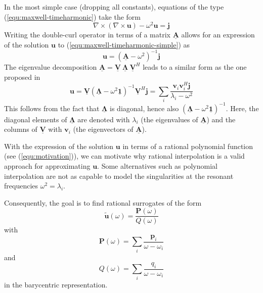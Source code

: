 \documentclass[11pt, a4paper]{article}
\begin{document}
In the most simple case (dropping all constants), equations of the type
(\ref{equ:maxwell-timeharmonic}) take the form
\begin{equation}
    \nabla \times (\nabla \times \mathbf{u}) - \omega^2 \mathbf{u} = \mathbf{j}
    \label{equ:maxwell-timeharmonic-simple}
\end{equation}
Writing the double-curl operator in terms of a matrix $\mathbf{\underline{A}}$
allows for an expression of the solution $\mathbf{u}$ to (\ref{equ:maxwell-timeharmonic-simple})
as
\begin{equation}
    \mathbf{u} = (\mathbf{\underline{A}} - \omega^2)^{-1} \mathbf{j}
\end{equation}
The eigenvalue decomposition $\mathbf{\underline{A}} = \mathbf{\underline{V}}
~ \boldsymbol{\underline{\Lambda}} ~ \mathbf{\underline{V}}^H$
leads to a similar form as the one proposed in \cite{helmholtz-motivation}
\begin{equation}
    \mathbf{u} = \mathbf{\underline{V}} (\boldsymbol{\underline{\Lambda}} - \omega^2 \boldsymbol{\underline{1}})^{-1} \mathbf{\underline{V}}^H \mathbf{j} 
    = \sum_i \frac{\mathbf{v}_i \mathbf{v}_i^H \mathbf{j}}{\lambda_i - \omega^2} \label{equ:motivation}
\end{equation}
This follows from the fact that $\boldsymbol{\underline{\Lambda}}$ is diagonal,
hence also $(\boldsymbol{\underline{\Lambda}} - \omega^2 \boldsymbol{\underline{1}})^{-1}$.
Here, the diagonal elements of $\boldsymbol{\underline{\Lambda}}$ are denoted with 
$\lambda_i$ (the eigenvalues of $\mathbf{\underline{A}}$) and the columns of
$\mathbf{\underline{V}}$ with $\mathbf{v}_i$ (the eigenvectors of $\mathbf{\underline{A}}$).

With the expression of the solution $\mathbf{u}$ in terms of a rational polynomial
function (see (\ref{equ:motivation})), we can motivate why rational interpolation
is a valid approach for approximating $\mathbf{u}$. Some alternatives such as polynomial
interpolation are not as capable to model the singularities at the resonant
frequencies $\omega^2 = \lambda_i$.

Consequently, the goal is to find rational surrogates of the form
\begin{equation}
    \mathbf{\tilde{u}}(\omega) = \frac{\mathbf{P}(\omega)}{Q(\omega)}
\end{equation}
with
\begin{equation}
    \mathbf{P}(\omega) = \sum_i \frac{\mathbf{p}_i}{\omega - \omega_i}
\end{equation}
and
\begin{equation}
    Q(\omega) = \sum_i \frac{q_i}{\omega - \omega_i} \label{equ:surrogate-denomniator}
\end{equation}
in the barycentric representation.
\end{document}
